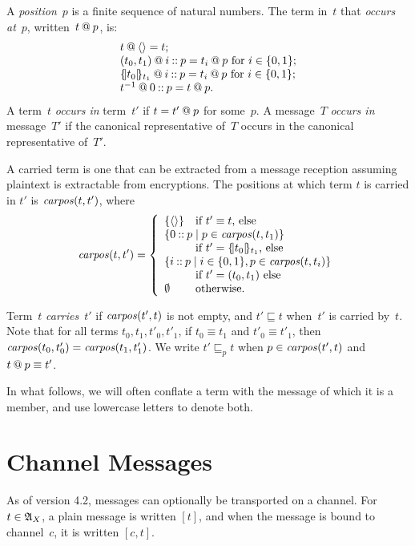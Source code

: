 \documentclass[12pt]{report}
\theoremstyle{definition}
\newcommand{\alga}{\alg{A}}
\newcommand{\carpos}{\fn{carpos}}
\begin{document}
A \emph{position}~$p$ is a finite sequence of natural
numbers.  The term in~$t$ that \emph{occurs at}~$p$, written~$t\mathbin{@}
p$, is:
$$\begin{array}{l}
t\mathbin{@}\langle\rangle=t;\\
(t_0,t_1)\mathbin{@} i\mathbin{::} p=t_i\mathbin{@} p\mbox{ for $i\in\{0,1\}$};\\
\{\!|t_0|\!\}_{t_1}\mathbin{@} i\mathbin{::} p=t_i\mathbin{@} p\mbox{ for
  $i\in\{0,1\}$};\\
t^{-1}\mathbin{@} 0\mathbin{::} p=t\mathbin{@} p.
\end{array}$$
A term~$t$ \emph{occurs in} term~$t'$ if $t=t'\mathbin{@}
p$ for some~$p$.  A message~$T$ \emph{occurs in} message~$T'$ if the
canonical representative of~$T$ occurs in the canonical representative
of~$T'$.

A carried term is one that can be extracted from a message reception
assuming plaintext is extractable from encryptions.  The positions at
which term $t$ is carried in $t'$ is $\carpos(t,t')$\index{carpos@\carpos}\label{def:carried positions},
where
$$\carpos(t,t')=\left\{
\begin{array}{ll}
\{\seq{}\}&\mbox{if $t'\equiv t$, else}\\
\multicolumn{2}{l}{\{0\cons p \mid
p\in\carpos(t,t_1)\}}\\
& \mbox{if $t'=\enc{t_0}{t_1}$, else}\\
\multicolumn{2}{l}{\{i\cons p \mid
i\in\{0,1\}, p\in\carpos(t,t_i)\}} \\
& \mbox{if $t'=(t_0,t_1)$ else}\\
\emptyset&\mbox{otherwise.}
\end{array}\right.  %
$$

Term~$t$ \emph{carries}~$t'$ if $\carpos(t',t)$ is not
empty, and $t'\sqsubseteq t$ when~$t'$ is carried by~$t$.  Note that
for all terms $t_0,t_1,t'_0,t'_1$, if $t_0\equiv t_1$ and $t'_0\equiv
t'_1$, then $\carpos(t_0,t'_0)= \carpos(t_1,t'_1)$.  We write $t'
\sqsubseteq_p t$ when $p \in \carpos(t',t)$ and $t \mathbin{@} p \equiv
t'$.

In what follows, we will often conflate a term with the message of
which it is a member, and use lowercase letters to denote both.

\section{Channel Messages}

As of {\cpsa} version 4.2, messages can optionally be transported on a
channel.  For $t\in\alga_X$, a plain message is written $[t]$, and
when the message is bound to channel~$c$, it is written $[c,t]$.
\end{document}
